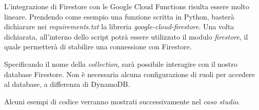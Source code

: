 L'integrazione di Firestore con le Google Cloud Functions risulta essere molto lineare. Prendendo come esempio una funzione scritta in Python, basterà dichiarare nei \textit{requirements.txt} la libreria \textit{google-cloud-firestore}. Una volta dichiarata, all'interno dello script potrà essere utilizzato il modulo \textit{firestore}, il quale permetterà di stabilire una connessione con Firestore.

Specificando il nome della \textit{collection}, sarà possibile interagire con il nostro database Firestore. Non è necessaria alcuna configurazione di ruoli per accedere al database, a differenza di DynamoDB.

Alcuni esempi di codice verranno mostrati successivamente nel \textit{caso studio}.